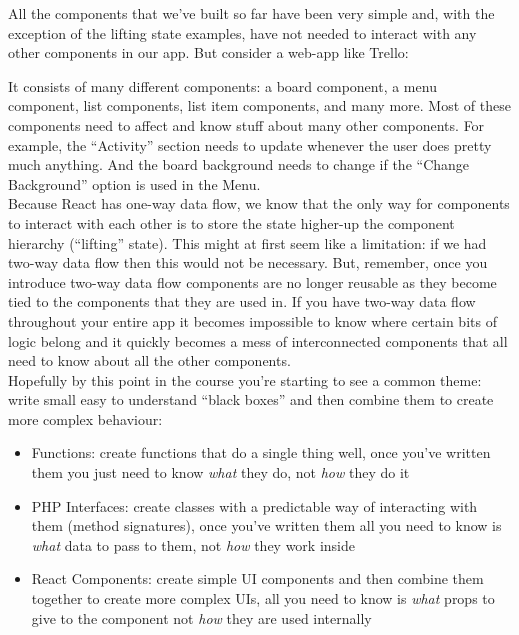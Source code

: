

All the components that we've built so far have been very simple and, with the exception of the lifting state examples, have not needed to interact with any other components in our app. But consider a web-app like Trello:


It consists of many different components: a board component, a menu component, list components, list item components, and many more. Most of these components need to affect and know stuff about many other components. For example, the ``Activity'' section needs to update whenever the user does pretty much anything. And the board background needs to change if the ``Change Background'' option is used in the Menu.
\\

Because React has one-way data flow, we know that the only way for components to interact with each other is to store the state higher-up the component hierarchy (``lifting'' state). This might at first seem like a limitation: if we had two-way data flow then this would not be necessary. But, remember, once you introduce two-way data flow components are no longer reusable as they become tied to the components that they are used in. If you have two-way data flow throughout your entire app it becomes impossible to know where certain bits of logic belong and it quickly becomes a mess of interconnected components that all need to know about all the other components.
\\

Hopefully by this point in the course you're starting to see a common theme: write small easy to understand ``black boxes'' and then combine them to create more complex behaviour:

\begin{itemize}
    \item Functions: create functions that do a single thing well, once you've written them you just need to know \textit{what} they do, not \textit{how} they do it
    \item PHP Interfaces: create classes with a predictable way of interacting with them (method signatures), once you've written them all you need to know is \textit{what} data to pass to them, not \textit{how} they work inside
    \item React Components: create simple UI components and then combine them together to create more complex UIs, all you need to know is \textit{what} props to give to the component not \textit{how} they are used internally
\end{itemize}

